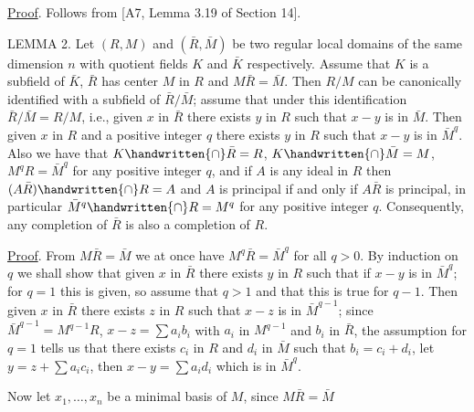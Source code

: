 \uline{Proof}. Follows from [A7, Lemma 3.19 of Section 14].

LEMMA 2. Let $(R,M)$ and $(\bar R,\bar M)$ be two regular local domains of the same dimension $n$ with quotient fields $K$ and $\bar K$ respectively. Assume that $K$ is a subfield of $\bar K$, $\bar R$ has center $M$ in $R$ and $M\bar R=\bar M$. Then $R/M$ can be canonically identified with a subfield of $\bar R/\bar M$; assume that under this identification $\bar R/\bar M=R/M$, i.e., given $x$ in $\bar R$ there exists $y$ in $R$ such that $x-y$ is in $\bar M$. Then given $x$ in $R$ and a positive integer $q$ there exists $y$ in $R$ such that $x-y$ is in $\bar M^q$. Also we have that $K\handwritten{\cap}\bar R=R$, $K\handwritten{\cap}\bar M=M$, $M^qR=\bar M^q$ for any positive integer $q$, and if $A$ is any ideal in $R$ then $(A\bar R)\handwritten{\cap}R=A$ and $A$ is principal if and only if $A\bar R$ is principal, in particular $\bar M^q\handwritten{\cap}R=M^q$ for any positive integer $q$. Consequently, any completion of $\bar R$ is also a completion of $R$.

\uline{Proof}. From $M\bar R=\bar M$ we at once have $M^q\bar R=\bar M^q$ for all $q>0$. By induction on $q$ we shall show that given $x$ in $\bar R$ there exists $y$ in $R$ such that if $x-y$ is in $\bar M^q$; for $q=1$ this is given, so assume that $q>1$ and that this is true for $q-1$. Then given $x$ in $\bar R$ there exists $z$ in $R$ such that $x-z$ is in $\bar M^{q-1}$; since $\bar M^{q-1}=M^{q-1}R$, $x-z=\sum a_i b_i$ with $a_i$ in $M^{q-1}$ and $b_i$ in $\bar R$, the assumption for $q=1$ tells us that there exists $c_i$ in $R$ and $d_i$ in $\bar M$ such that $b_i=c_i+d_i$, let $y=z+\sum a_i c_i$, then $x-y=\sum a_i d_i$ which is in $\bar M^q$.

Now let $x_1,\ldots,x_n$ be a minimal basis of $M$, since $M\bar R=\bar M$
